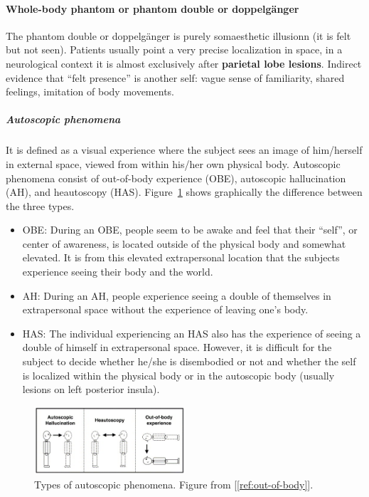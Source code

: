 \documentclass[12pt,article,oneside,a4paper]{memoir}
\begin{document}
\paragraph{Whole-body phantom or phantom double or doppelg\"anger}
The phantom double or doppelg\"anger is purely somaesthetic illusionn (it is
felt but not seen). Patients usually point a very precise localization in space,
in a neurological context it is almost exclusively after \textbf{parietal lobe
lesions}. Indirect evidence that ``felt presence'' is another self: vague sense
of familiarity, shared feelings, imitation of body movements.

\subparagraph{Autoscopic phenomena}
It is defined as a visual experience where the subject sees an image of 
him/herself in external space, viewed from within his/her own physical body.
Autoscopic phenomena consist of out-of-body experience (OBE), autoscopic
hallucination (AH), and heautoscopy (HAS). Figure~\ref{fig:autoscopic-phenomena}
shows graphically the difference between the three types.
\begin{itemize}
\item OBE: During an OBE, people seem to be awake and feel that their ``self'',
or center of awareness, is located outside of the physical body and somewhat
elevated. It is from this elevated extrapersonal location that the subjects
experience seeing their body and the world.
\item AH: During an AH, people experience seeing a double of themselves in 
extrapersonal space without the experience of leaving one's body.
\item HAS: The individual experiencing an HAS also has the experience of seeing
a double of himself in extrapersonal space. However, it is difficult for the
subject to decide whether he/she is disembodied or not and whether the self is
localized within the physical body or in the autoscopic body (usually lesions on
left posterior insula).
\end{itemize}

\begin{figure}[h]
  \centering
  \includegraphics[width=0.5\textwidth]{imgs/autoscopic-phenomena.png}
  \caption{Types of autoscopic phenomena. Figure from [\ref{ref:out-of-body}]. }
  \label{fig:autoscopic-phenomena}
\end{figure}
\end{document}
